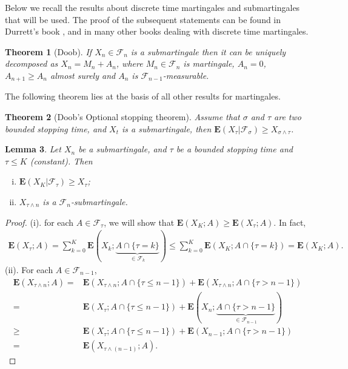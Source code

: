 \documentclass[twoside, 12pt]{book}
\numberwithin{equation}{chapter}
\newtheorem{theorem}{Theorem}[section]
\newtheorem{lemma}[theorem]{Lemma}
\def\cF{{\mathcal F}}
\def\bE{{\mathbf E}}
\def\geq{\geqslant}
\def\leq{\leqslant}
\begin{document}
 Below we recall the results about discrete time martingales and submartingales that will be used. The proof of the subsequent statements can be found in Durrett’s book \cite{durrett2019probability}, and in many other books dealing with discrete time martingales.
	\begin{theorem}[Doob]\label{thm:Doob-D}
 If $X_n\in \cF_n$  is a submartingale then it can be uniquely decomposed as $X_n=M_n+A_n$, where $M_n\in \cF_n$ is martingale, $A_n=0$, $A_{n+1}\geq A_n$ almost surely and $A_n$ is $\cF_{n-1}$-measurable.
	\end{theorem}
	The following theorem lies at the basis of all other results for
	martingales.
	\begin{theorem}[Doob's Optional stopping theorem]\label{thm:Doob}
		Assume that $\sigma$ and $\tau$ are two bounded stopping time, and $X_t$ is a submartingale, then $\bE (X_{\tau}|\cF_{\sigma}) \geq  X_{\sigma\wedge \tau}$.  
	\end{theorem}
	
	\begin{lemma}
		Let  $X_n$ be a submartingale, and $\tau$ be a bounded stopping time and $\tau\leq K$ (constant). Then 
		\begin{enumerate}[(i)]
			\item $\bE(X_{K}|\cF_\tau)\geq X_\tau$; 
			\item $X_{\tau\wedge n}$ is a $\cF_n$-submartingale. 
		\end{enumerate}
	\end{lemma}
	\begin{proof}
		(i). for each $A\in \cF_\tau$, we will show that $\bE(X_K; A)\geq \bE (X_\tau; A)$. In fact, 
		\begin{align*}
			\bE (X_\tau; A)=\sum_{k=0}^K \bE (X_{k}; \underbrace{A\cap \{\tau=k\}}_{\in \cF_k})\leq \sum_{k=0}^K \bE (X_{K}; A\cap \{\tau=k\}) = \bE (X_K; A). 
		\end{align*}
		(ii). For each $A\in \cF_{n-1}$, 
		\begin{align*}
			\bE(X_{\tau\wedge n}; A)=&\bE(X_{\tau\wedge n}; A\cap\{\tau\leq n-1\})+\bE(X_{\tau\wedge n}; A\cap\{\tau> n-1\})\\
			=&\bE(X_{\tau}; A\cap\{\tau \leq n-1\})+\bE(X_{n}; \underbrace{A\cap\{\tau> n-1\}}_{\in \cF_{n-1}})\\
			\geq& \bE(X_{\tau}; A\cap\{\tau\leq n-1\})+\bE(X_{n-1}; A\cap\{\tau> n-1\})\\
			=& \bE(X_{\tau\wedge (n-1)}; A).
		\end{align*}
	\end{proof}
	
\end{document}
